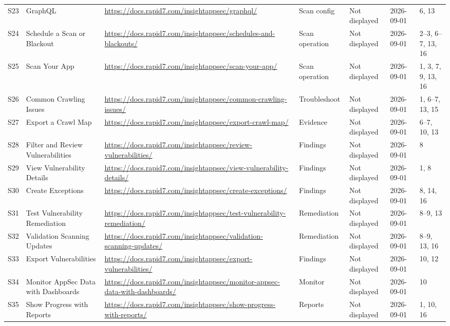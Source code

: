 \documentclass[11pt,letterpaper,oneside]{scrreprt}
\begin{document}
\begin{landscape}
\begin{longtable}{@{}P{0.34in}P{1.40in}P{3.00in}P{0.95in}P{0.75in}P{0.72in}P{1.55in}@{}}
\label{src:S23}S23 & GraphQL & \url{https://docs.rapid7.com/insightappsec/graphql/} & Scan config & Not displayed & 2026-09-01 & 6, 13\\
\label{src:S24}S24 & Schedule a Scan or Blackout & \url{https://docs.rapid7.com/insightappsec/schedules-and-blackouts/} & Scan operation & Not displayed & 2026-09-01 & 2--3, 6--7, 13, 16\\
\label{src:S25}S25 & Scan Your App & \url{https://docs.rapid7.com/insightappsec/scan-your-app/} & Scan operation & Not displayed & 2026-09-01 & 1, 3, 7, 9, 13, 16\\
\label{src:S26}S26 & Common Crawling Issues & \url{https://docs.rapid7.com/insightappsec/common-crawling-issues/} & Troubleshoot & Not displayed & 2026-09-01 & 1, 6--7, 13, 15\\
\label{src:S27}S27 & Export a Crawl Map & \url{https://docs.rapid7.com/insightappsec/export-crawl-map/} & Evidence & Not displayed & 2026-09-01 & 6--7, 10, 13\\
\label{src:S28}S28 & Filter and Review Vulnerabilities & \url{https://docs.rapid7.com/insightappsec/review-vulnerabilities/} & Findings & Not displayed & 2026-09-01 & 8\\
\label{src:S29}S29 & View Vulnerability Details & \url{https://docs.rapid7.com/insightappsec/view-vulnerability-details/} & Findings & Not displayed & 2026-09-01 & 1, 8\\
\label{src:S30}S30 & Create Exceptions & \url{https://docs.rapid7.com/insightappsec/create-exceptions/} & Findings & Not displayed & 2026-09-01 & 8, 14, 16\\
\label{src:S31}S31 & Test Vulnerability Remediation & \url{https://docs.rapid7.com/insightappsec/test-vulnerability-remediation/} & Remediation & Not displayed & 2026-09-01 & 8--9, 13\\
\label{src:S32}S32 & Validation Scanning Updates & \url{https://docs.rapid7.com/insightappsec/validation-scanning-updates/} & Remediation & Not displayed & 2026-09-01 & 8--9, 13, 16\\
\label{src:S33}S33 & Export Vulnerabilities & \url{https://docs.rapid7.com/insightappsec/export-vulnerabilities/} & Findings & Not displayed & 2026-09-01 & 10, 12\\
\label{src:S34}S34 & Monitor AppSec Data with Dashboards & \url{https://docs.rapid7.com/insightappsec/monitor-appsec-data-with-dashboards/} & Monitor & Not displayed & 2026-09-01 & 10\\
\label{src:S35}S35 & Show Progress with Reports & \url{https://docs.rapid7.com/insightappsec/show-progress-with-reports/} & Reports & Not displayed & 2026-09-01 & 1, 10, 16\\

\end{longtable}
\end{landscape}
\end{document}
